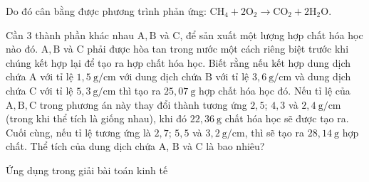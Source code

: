 \begin{bt}
\begin{vd}
{Do đó cân bằng được phương trình phản ứng:
$\mathrm{CH}_4+2 \mathrm{O}_2\rightarrow\mathrm{CO}_2+2 \mathrm{H}_2 \mathrm{O}$.
}
	\end{vd}
\begin{vd}%
	Cần 3 thành phần khác nhau $\mathrm{A}, \mathrm{B}$ và $\mathrm{C}$, để sản xuất một lượng hợp chất hóa học nào đó. $\mathrm{A}, \mathrm{B}$ và C phải được hòa tan trong nước một cách riêng biệt trước khi chúng kết hợp lại để tạo ra hợp chất hóa học. Biết rằng nếu kết hợp dung dịch chứa $\mathrm{A}$ với tỉ lệ $1{,}5 \mathrm{~g} / \mathrm{cm}$ với dung dịch chứa $\mathrm{B}$ với tỉ lệ $3{,}6 \mathrm{~g} / \mathrm{cm}$ và dung dịch chứa $\mathrm{C}$ với tỉ lệ $5{,}3 \mathrm{~g} / \mathrm{cm}$ thì tạo ra $25{,}07 \mathrm{~g}$ hợp chất hóa học đó. Nếu tỉ lệ của $\mathrm{A}, \mathrm{B}, \mathrm{C}$ trong phương án này thay đổi thành tương ứng $2{,}5$; $4{,}3$ và $2{,}4 \mathrm{~g} / \mathrm{cm}$ (trong khi thể tích là giống nhau), khi đó $22{,}36 \mathrm{~g}$ chất hóa học sẽ được tạo ra. Cuối cùng, nếu tỉ lệ tương ứng là $2{,}7$; $5{,}5$ và $3{,}2 \mathrm{~g} / \mathrm{cm}$, thì sẽ tạo ra $28{,}14 \mathrm{~g}$ hợp chất. Thể tích của dung dịch chứa $\mathrm{A}$, $\mathrm{B}$ và $\mathrm{C}$ là bao nhiêu?
	\end{vd}
\begin{dang}{Ứng dụng trong giải bài toán kinh tế}
	

\end{dang}
\end{bt}
